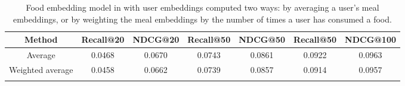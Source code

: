 \begin{table}[!htbp]
\centering
\begin{tabular}{ccccccc}
\toprule
Method & Recall@20 & NDCG@20 & Recall@50 & NDCG@50 & Recall@50 & NDCG@100 \\
\midrule
Average & 0.0468 & 0.0670 & 0.0743 & 0.0861 & 0.0922 & 0.0963 \\
Weighted average & 0.0458 & 0.0662 & 0.0739 & 0.0857 & 0.0914 & 0.0957 \\
\bottomrule\\
\end{tabular}
\caption{Food embedding model in  with user
embeddings
computed two ways: by averaging a user's meal embeddings, or by weighting the
meal embeddings by the number of times a user has consumed a food.}
\label{tab:food_emb}
\end{table}
